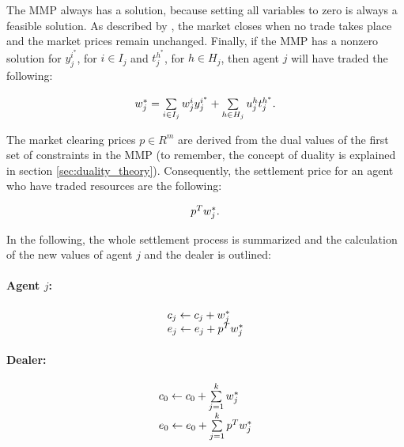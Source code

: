 The MMP always has a solution, because setting all variables to zero 
is always a feasible solution. As described by , the market closes when no trade takes place 
and the market prices remain unchanged. Finally, if the MMP has a nonzero solution for
 $y_{j}^{i^{*}}$, for $i \in I_{j}$ and $t_{j}^{h^{*}}$, for $h \in H_{j}$, then agent $j$ will have traded the following:

 \begin{equation*}
 \begin{array}{ll@{}ll}
 w_{j}^{*} = 
 \sum\limits_{i \in I_{j}}^{} w_{j}^{i}y_{j}^{i^{*}} + 
 \sum\limits_{h \in H_{j}}^{} u_{j}^{h}t_{j}^{h^{*}}.
 \end{array}
\end{equation*}

The market clearing prices $p \in R^{m}$ are derived from the dual values of the first set of constraints in the MMP
(to remember, the concept of duality is explained in section \ref{sec:duality_theory}).
Consequently, the settlement price for an agent who have traded resources are the following:

\begin{equation*}
 \begin{array}{ll@{}ll}
 p^{T} w_{j}^{*}.
 \end{array}
\end{equation*}

In the following, the whole settlement process is summarized and the calculation of the new values of agent $j$ and the dealer 
is outlined:

\paragraph*{Agent $j$:}
\begin{equation*}
 \begin{array}{ll@{}ll}
 c_{j} \leftarrow c_{j} + w_{j}^{*} \\
 e_{j} \leftarrow e_{j} + p^{T} w_{j}^{*} \\
 \end{array}
\end{equation*}

\paragraph*{Dealer:}
\begin{equation*}
 \begin{array}{ll@{}ll}
 c_{0} \leftarrow c_{0} + \sum\limits_{j=1}^{k} w_{j}^{*} \\
 e_{0} \leftarrow e_{0} + \sum\limits_{j=1}^{k} p^{T} w_{j}^{*} \\
 \end{array}
\end{equation*}


